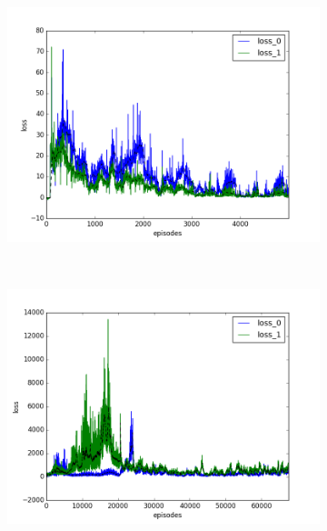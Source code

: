 \begin{figure}[t]
  \vspace{-0.5cm}
  \begin{subfigure}[t]{\figscale\linewidth}
    \hspace*{-2.75cm}
    \includegraphics[width=1.5\textwidth]
    {../results/dqn_1vs1/loss.png}
    \label{fig:dqn-1vs1-loss}
  \end{subfigure}
  ~
  \begin{subfigure}[t]{\figscale\linewidth}
    \hspace*{-1.4cm}
    \includegraphics[width=1.5\textwidth]
    {../results/ddpg_1vs1/loss.png}
    \label{fig:ddpg-1vs1-loss}
  \end{subfigure}
  ~
  \begin{subfigure}[t]{\figscale\linewidth}

\end{subfigure}
\end{figure}
